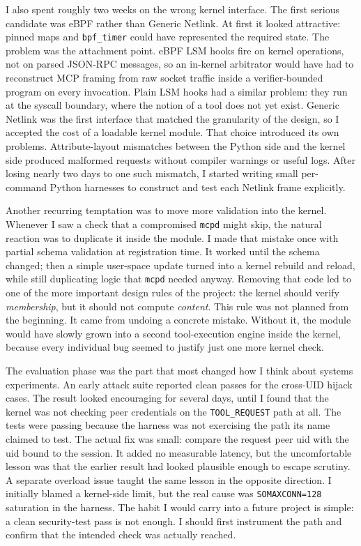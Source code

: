 I also spent roughly two weeks on the wrong kernel interface.
The first serious candidate was eBPF rather than Generic Netlink.
At first it looked attractive: pinned maps and \texttt{bpf\_\allowbreak timer} could have represented the required state.
The problem was the attachment point.
eBPF LSM hooks fire on kernel operations, not on parsed JSON-RPC messages, so an in-kernel arbitrator would have had to reconstruct MCP framing from raw socket traffic inside a verifier-bounded program on every invocation.
Plain LSM hooks had a similar problem: they run at the syscall boundary, where the notion of a tool does not yet exist.
Generic Netlink was the first interface that matched the granularity of the design, so I accepted the cost of a loadable kernel module.
That choice introduced its own problems.
Attribute-layout mismatches between the Python side and the kernel side produced malformed requests without compiler warnings or useful logs.
After losing nearly two days to one such mismatch, I started writing small per-command Python harnesses to construct and test each Netlink frame explicitly.

Another recurring temptation was to move more validation into the kernel.
Whenever I saw a check that a compromised \texttt{mcpd} might skip, the natural reaction was to duplicate it inside the module.
I made that mistake once with partial schema validation at registration time.
It worked until the schema changed; then a simple user-space update turned into a kernel rebuild and reload, while still duplicating logic that \texttt{mcpd} needed anyway.
Removing that code led to one of the more important design rules of the project: the kernel should verify \emph{membership}, but it should not compute \emph{content}.
This rule was not planned from the beginning.
It came from undoing a concrete mistake.
Without it, the module would have slowly grown into a second tool-execution engine inside the kernel, because every individual bug seemed to justify just one more kernel check.

The evaluation phase was the part that most changed how I think about systems experiments.
An early attack suite reported clean passes for the cross-UID hijack cases.
The result looked encouraging for several days, until I found that the kernel was not checking peer credentials on the \texttt{TOOL\_\allowbreak REQUEST} path at all.
The tests were passing because the harness was not exercising the path its name claimed to test.
The actual fix was small: compare the request peer uid with the uid bound to the session.
It added no measurable latency, but the uncomfortable lesson was that the earlier result had looked plausible enough to escape scrutiny.
A separate overload issue taught the same lesson in the opposite direction.
I initially blamed a kernel-side limit, but the real cause was \texttt{SOMAXCONN=128} saturation in the harness.
The habit I would carry into a future project is simple: a clean security-test pass is not enough.
I should first instrument the path and confirm that the intended check was actually reached.

